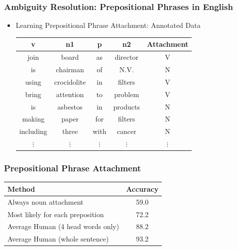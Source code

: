 \begin{frame}
\frametitle{Ambiguity Resolution: Prepositional Phrases in English}
  \begin{itemize}
  \item Learning Prepositional Phrase Attachment: Annotated Data
\begin{tabular}{|cccc|c|}
\hline
v    &     n1   &      p & n2 &       Attachment\\
\hline
join   &   board    &   as &  director & V \\
is       & chairman  &  of  & N.V.    & N \\
using  &   crocidolite & in  & filters & V \\
bring  &   attention  & to  & problem &  V \\ 
is      &  asbestos   & in &  products & N \\
making &   paper    &   for & filters & N \\
including & three     &  with & cancer &  N \\
$\vdots$ & $\vdots$ & $\vdots$ & $\vdots$ & $\vdots$ \\
\hline
\end{tabular}
  \end{itemize}

\end{frame}

\begin{frame}
\frametitle{Prepositional Phrase Attachment}
\begin{tabular}{|l|c|}  \hline
Method & Accuracy \\ \hline
Always noun attachment & 59.0 \\
Most likely for each preposition & 72.2 \\
Average Human (4 head words only) & 88.2 \\
Average Human (whole sentence) & 93.2 \\  \hline
\end{tabular}
\end{frame}

